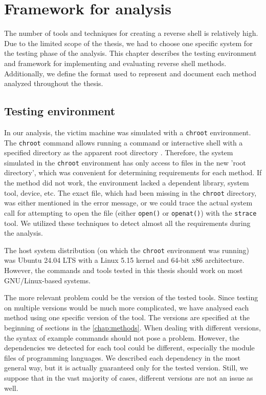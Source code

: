 \chapter{Framework for analysis}
\label{chap:framework}

The number of tools and techniques for creating a reverse shell is relatively high. Due to the limited scope of the thesis, we had to choose one specific system for the testing phase of the analysis. This chapter describes the testing environment and framework for implementing and evaluating reverse shell methods. Additionally, we define the format used to represent and document each method analyzed throughout the thesis.

\section{Testing environment}
\label{testing-env}

In our analysis, the victim machine was simulated with a \texttt{chroot} environment. The \texttt{chroot} command allows running a command or interactive shell with a specified directory as the apparent root directory \cite{chroot-man}. Therefore, the system simulated in the \texttt{chroot} environment has only access to files in the new 'root directory', which was convenient for determining requirements for each method. If the method did not work, the environment lacked a dependent library, system tool, device, etc. The exact file, which had been missing in the \texttt{chroot} directory, was either mentioned in the error message, or we could trace the actual system call for attempting to open the file (either \texttt{open()} or \texttt{openat()}) with the \texttt{strace} tool. We utilized these techniques to detect almost all the requirements during the analysis.

The host system distribution (on which the \texttt{chroot} environment was running) was Ubuntu 24.04 LTS with a Linux 5.15 kernel and 64-bit x86 architecture. However, the commands and tools tested in this thesis should work on most GNU/Linux-based systems.

The more relevant problem could be the version of the tested tools. Since testing on multiple versions would be much more complicated, we have analysed each method using one specific version of the tool. The versions are specified at the beginning of sections in the \cref{chap:methods}. When dealing with different versions, the syntax of example commands should not pose a problem. However, the dependencies we detected for each tool could be different, especially the module files of programming languages. We described each dependency in the most general way, but it is actually guaranteed only for the tested version. Still, we suppose that in the vast majority of cases, different versions are not an issue as well.

